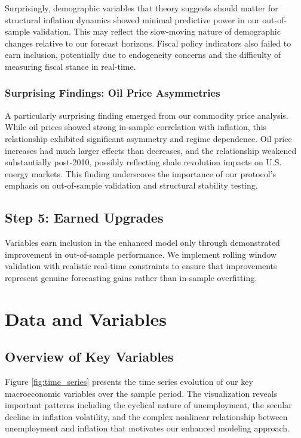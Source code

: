 \documentclass[12pt]{article}
\begin{document}
Surprisingly, demographic variables that theory suggests should matter for structural inflation dynamics showed minimal predictive power in our out-of-sample validation. This may reflect the slow-moving nature of demographic changes relative to our forecast horizons. Fiscal policy indicators also failed to earn inclusion, potentially due to endogeneity concerns and the difficulty of measuring fiscal stance in real-time.

\subsubsection{Surprising Findings: Oil Price Asymmetries}

A particularly surprising finding emerged from our commodity price analysis. While oil prices showed strong in-sample correlation with inflation, this relationship exhibited significant asymmetry and regime dependence. Oil price increases had much larger effects than decreases, and the relationship weakened substantially post-2010, possibly reflecting shale revolution impacts on U.S. energy markets. This finding underscores the importance of our protocol's emphasis on out-of-sample validation and structural stability testing.

\subsection{Step 5: Earned Upgrades}

Variables earn inclusion in the enhanced model only through demonstrated improvement in out-of-sample performance. We implement rolling window validation with realistic real-time constraints to ensure that improvements represent genuine forecasting gains rather than in-sample overfitting.

\section{Data and Variables}

\subsection{Overview of Key Variables}

Figure \ref{fig:time_series} presents the time series evolution of our key macroeconomic variables over the sample period. The visualization reveals important patterns including the cyclical nature of unemployment, the secular decline in inflation volatility, and the complex nonlinear relationship between unemployment and inflation that motivates our enhanced modeling approach.
\end{document}
